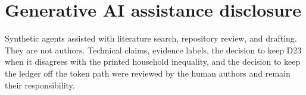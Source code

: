 \documentclass[11pt]{article}
\begin{document}
\section*{Generative AI assistance disclosure}
Synthetic agents assisted with literature search, repository review, and drafting. They are not authors. Technical claims, evidence labels, the decision to keep D23 when it disagrees with the printed household inequality, and the decision to keep the ledger off the token path were reviewed by the human authors and remain their responsibility.
\end{document}
